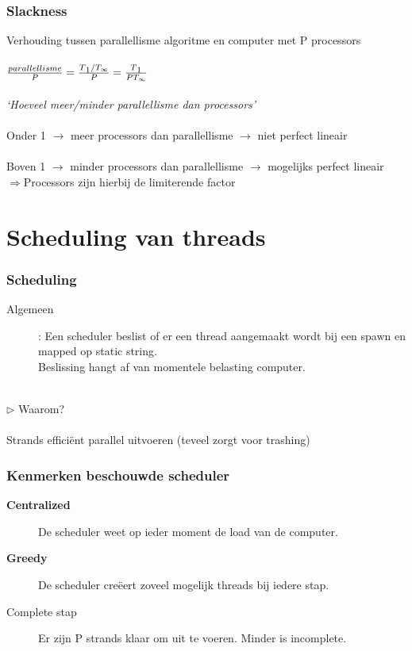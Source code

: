 \documentclass
   [kulak] %
   {kulakbeamer}
\begin{document}
\begin{frame}
	\frametitle{Slackness}
	Verhouding tussen parallellisme algoritme en computer met P processors\\~\\
	$\frac{parallellisme}{P} = \frac{T\textsubscript{1}/T_\infty}{P} =  \frac{T\textsubscript{1}}{PT_\infty}$ ~\\~\\
	\textit{`Hoeveel meer/minder parallellisme dan processors'}\\~\\
	Onder 1 $\rightarrow$ meer processors dan parallellisme $\rightarrow$ niet perfect lineair \\~\\
	Boven 1 $\rightarrow$ minder processors dan parallellisme $\rightarrow$ mogelijks perfect lineair \\ $\Rightarrow$Processors zijn hierbij de limiterende factor
\end{frame}

\section[Scheduling]{Scheduling van threads}

\begin{frame}
\frametitle{Scheduling}
\begin{description}
\item
 [Algemeen]: Een scheduler beslist of er een thread aangemaakt wordt bij een spawn en mapped op static string.\\Beslissing hangt af van momentele belasting computer.\\~\\ 
\end{description}
$\triangleright$ Waarom? \\~\\ Strands efficiënt parallel uitvoeren (teveel zorgt voor trashing)
\end{frame}

\begin{frame}
	\frametitle{Kenmerken beschouwde scheduler}
	\begin{description}
		\item[\textbf{Centralized}] De scheduler weet op ieder moment de load van de computer.
		\item[\textbf{Greedy}] De scheduler creëert zoveel mogelijk threads bij iedere stap.
		\item[Complete stap] Er zijn P strands klaar om uit te voeren. Minder is incomplete.
	\end{description}
\end{frame}
\end{document}
